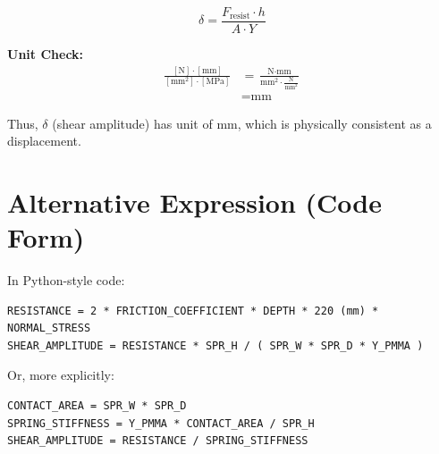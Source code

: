 \documentclass{article}
\begin{document}
\begin{equation}
\delta = \frac{F_{\text{resist}} \cdot h}{A \cdot Y}
\end{equation}

\textbf{Unit Check:}
\begin{align*}
\frac{[\si{\newton}] \cdot [\si{\milli\meter}]}{[\si{\milli\meter\squared}] \cdot [\si{\mega\pascal}]} 
&= \frac{\si{\newton} \cdot \si{\milli\meter}}{\si{\milli\meter\squared} \cdot \frac{\si{\newton}}{\si{\milli\meter\squared}}} \\
&= \si{\milli\meter}
\end{align*}

Thus, $\delta$ (shear amplitude) has unit of \si{\milli\meter}, which is physically consistent as a displacement.

\section*{Alternative Expression (Code Form)}

In Python-style code:

\begin{verbatim}
RESISTANCE = 2 * FRICTION_COEFFICIENT * DEPTH * 220 (mm) * NORMAL_STRESS
SHEAR_AMPLITUDE = RESISTANCE * SPR_H / ( SPR_W * SPR_D * Y_PMMA )
\end{verbatim}

Or, more explicitly:

\begin{verbatim}
CONTACT_AREA = SPR_W * SPR_D
SPRING_STIFFNESS = Y_PMMA * CONTACT_AREA / SPR_H
SHEAR_AMPLITUDE = RESISTANCE / SPRING_STIFFNESS
\end{verbatim}
\end{document}
